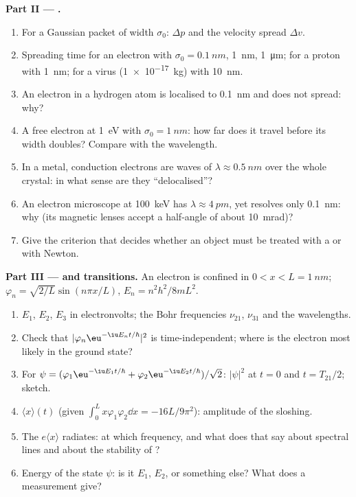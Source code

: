 \begin{problem}
\textbf{Part II --- .}
\begin{enumerate}[resume]
  \item For a Gaussian packet of width $\sigma_0$: $\Delta p$ and the
        velocity spread $\Delta v$.
  \item Spreading time for an electron with $\sigma_0 = \qty{0.1}{nm}$,
        \qty{1}{nm}, \qty{1}{\micro m}; for a proton with \qty{1}{nm}; for a
        virus (\qty{1e-17}{kg}) with \qty{10}{nm}.
  \item An electron in a hydrogen atom is localised to \qty{0.1}{nm}
        and does not spread: why?
  \item A free electron at \qty{1}{eV} with $\sigma_0 = \qty{1}{nm}$: how far
        does it travel before its width doubles? Compare with the
        wavelength.
  \item In a metal, conduction electrons are waves of $\lambda \approx
        \qty{0.5}{nm}$ over the whole crystal: in what sense are they
        ``delocalised''?
  \item An electron microscope at \qty{100}{keV} has $\lambda \approx
        \qty{4}{pm}$, yet resolves only \qty{0.1}{nm}: why (its magnetic
        lenses accept a half-angle of about \qty{10}{mrad})?
  \item Give the criterion that decides whether an object must be
        treated with a  or with Newton.
\end{enumerate}

\textbf{Part III ---  and transitions.}
An electron is confined in $0 < x < L = \qty{1}{nm}$; $\varphi_n =
\sqrt{2/L}\sin(n\pi x/L)$, $E_n = n^2h^2/8mL^2$.
\begin{enumerate}[resume]
  \item $E_1$, $E_2$, $E_3$ in electronvolts; the Bohr frequencies
        $\nu_{21}$, $\nu_{31}$ and the wavelengths.
  \item Check that $|\varphi_n\eu^{-\iu E_nt/\hbar}|^2$ is time-independent;
        where is the electron most likely in the ground state?
  \item For $\psi = (\varphi_1\eu^{-\iu E_1t/\hbar} + \varphi_2\eu^{-\iu E_2t/\hbar})/
        \sqrt2$: $|\psi|^2$ at $t = 0$ and $t = T_{21}/2$; sketch.
  \item $\langle x\rangle(t)$ (given $\int_0^Lx\varphi_1\varphi_2\dd x = -16L/9\pi^2$):
        amplitude of the sloshing.
  \item The  $e\langle x\rangle$ radiates: at which
        frequency, and what does that say about spectral lines and
        about the stability of ?
  \item Energy of the state $\psi$: is it $E_1$, $E_2$, or something
        else? What does a measurement give?
\end{enumerate}


\end{problem}
